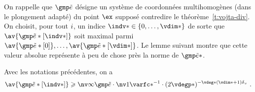On rappelle que \( \cexa \) désigne un système de coordonnées multihomogènes
(dans le plongement adapté) du point \( \ex \) supposé contredire le
théorème~\ref{t:vojta-div}.  On choisit, pour tout \(
  i \), un indice \( \indv* \in \set{0, \dots, \vdim*} \) de sorte que \(
  \av{ \cexa*[\indv*] } \) soit maximal parmi \( \av{\cexa*[0]}, \dots,
  \av{\cexa*[\vdim*]} \).  Le lemme suivant montre que cette valeur absolue
représente à peu de chose près la norme de \( \cexa* \).

\begin{lem} \label{l:coord-norm}
  Avec les notations précédentes, on a
  \begin{equation}
    \av{ \cexa*[\indv*] }
    \ge
    \nv\infty{ \cexa }
    \cdot \nv1{ \varfc* }^{-1}
    \cdot ( 2 \vdegp* )^{- \vdeg* (\vdim* + 1) \dv}
    \pmm.
  \end{equation}
\end{lem}

